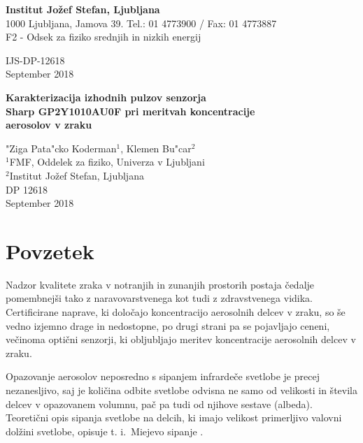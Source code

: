 \documentclass[12pt,a4paper]{article}
\begin{document}
{\Large\bfseries Institut Jožef Stefan, Ljubljana}\\
1000 Ljubljana, Jamova 39. Tel.: 01 4773900 / Fax: 01 4773887\\
F2 - Odsek za fiziko srednjih in nizkih energij

\vspace{15ex}
\hspace*{\fill}IJS-DP-12618\\[5ex]
\hspace*{\fill}September 2018\\

\vspace{10ex}
\begin{center}
{\large\bfseries
Karakterizacija izhodnih pulzov senzorja\\ Sharp GP2Y1010AU0F pri meritvah koncentracije\\ aerosolov v zraku
}
\vspace{5ex}

"Ziga Pata"cko Koderman$^1$, Klemen Bu"car$^2$\\[5mm]
$^1$FMF, Oddelek za fiziko, Univerza v Ljubljani\\
$^2$Institut Jožef Stefan, Ljubljana\\[8ex]
DP 12618\\[2ex]
September 2018
\end{center}


\thispagestyle{empty}
\newpage
\tableofcontents
\pagebreak

\section{Povzetek}

Nadzor kvalitete zraka v notranjih in zunanjih prostorih postaja čedalje pomembnejši tako z naravovarstvenega kot tudi z zdravstvenega vidika. Certificirane naprave, ki določajo koncentracijo aerosolnih delcev v zraku, so še vedno izjemno drage in nedostopne, po drugi strani pa se pojavljajo ceneni, večinoma optični senzorji, ki obljubljajo meritev koncentracije aerosolnih delcev v zraku.

Opazovanje aerosolov neposredno s sipanjem infrardeče svetlobe je precej nezanesljivo, saj je količina odbite svetlobe odvisna ne samo od velikosti in števila delcev v opazovanem volumnu, pač pa tudi od njihove sestave (albeda). Teoretični opis sipanja svetlobe na delcih, ki imajo velikost primerljivo valovni dolžini svetlobe, opisuje t. i.~Miejevo sipanje \cite{mie-scattering}.
\end{document}
